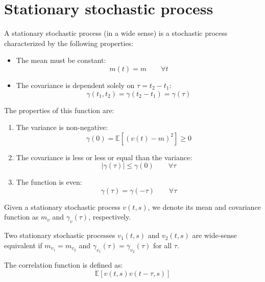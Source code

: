 \section{Stationary stochastic process}

\begin{definition}
    A stationary stochastic process (in a wide sense) is a stochastic process characterized by the following properties:
    \begin{itemize}
        \item The mean must be constant: 
            \[m(t)=m\qquad\forall t\]
        \item The covariance is dependent solely on $\tau=t_2-t_1$: 
            \[\gamma(t_1,t_2)=\gamma(t_2-t_1)=\gamma(\tau)\]
    \end{itemize}
\end{definition}

The properties of this function are:
\begin{enumerate}
    \item The variance is non-negative: 
        \[\gamma(0)=\mathbb{E}\left[{\left(v(t)-m\right)}^2\right]\geq 0\]
    \item The covariance is less or less or equal than the variance: 
        \[\left\lvert \gamma(\tau) \right\rvert \leq \gamma(0) \qquad \forall\tau\]
    \item The function is even: 
        \[\gamma(\tau)=\gamma(-\tau) \qquad\forall\tau\]
\end{enumerate}

\begin{property}
    Given a stationary stochastic process $v(t,s)$, we denote its mean and covariance function as $m_v$ and $\gamma_v(\tau)$, respectively.
\end{property}
\begin{property}
    Two stationary stochastic processes $v_1(t,s)$ and $v_2(t,s)$ are wide-sense equivalent if $m_{v_1}=m_{v_2}$ and $\gamma_{v_1}(\tau)=\gamma_{v_2}(\tau)$ for all $\tau$.
\end{property}
\begin{definition}
    The correlation function is defined as: 
    \[\mathbb{E}\left[ v(t,s)v(t-\tau,s) \right]\]
\end{definition}


